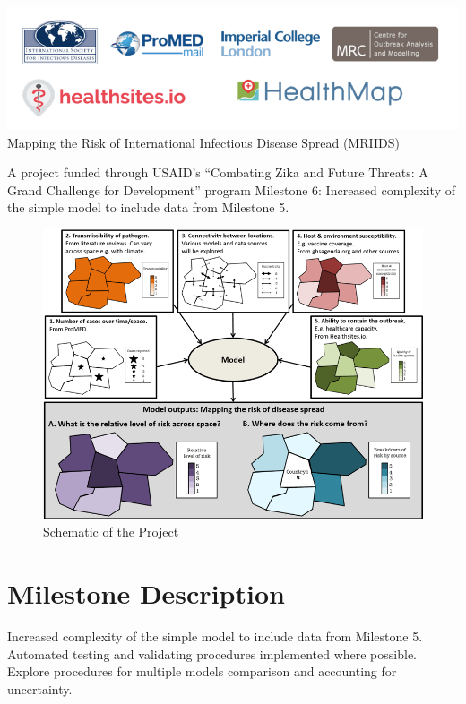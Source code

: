 \documentclass[11pt,]{article}
\begin{document}
\begin{titlepage}
  \centering
    \includegraphics[width=\linewidth]{ms6-figures/logo} %
    \linespread{1.2}\Large{Mapping the Risk of International Infectious Disease Spread
    (MRIIDS)}

   \linespread{1.2}\large{A project funded through USAID’s ``Combating Zika and
     Future Threats: A Grand Challenge for Development'' program}
   \vfill
    Milestone 6: Increased complexity of the simple model to include data from Milestone 5.
    \vfill
  \end{titlepage}
\tableofcontents

\newpage

\begin{figure}
   \centering
   \includegraphics[]{ms6-figures/schematic}
  \caption{Schematic of the Project}
\end{figure}

\section{Milestone Description}\label{milestone-description}

Increased complexity of the simple model to include data from Milestone
5. Automated testing and validating procedures implemented where
possible. Explore procedures for multiple models comparison and accounting for
uncertainty.
\end{document}
